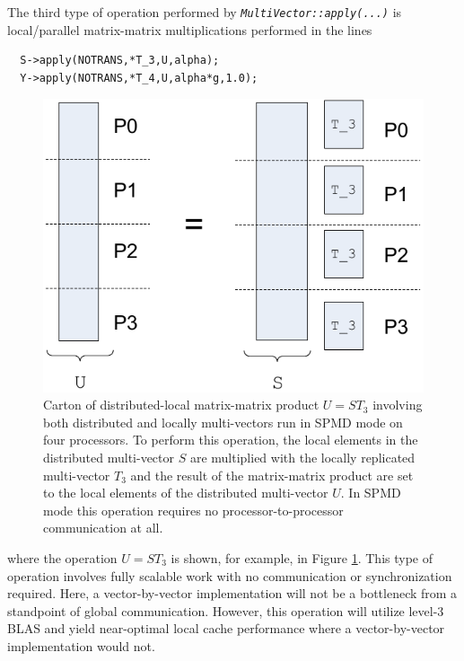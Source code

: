 \documentclass[pdf,ps2pdf,11pt]{SANDreport}
\begin{document}
The third type of operation performed by
{}\texttt{\textit{Multi\-Vector\-::apply(\-...)}} is local/parallel
matrix-matrix multiplications performed in the lines

{\scriptsize\begin{verbatim}
  S->apply(NOTRANS,*T_3,U,alpha);
  Y->apply(NOTRANS,*T_4,U,alpha*g,1.0);
\end{verbatim}}

{\bsinglespace
\begin{figure}
\begin{center}
\includegraphics*[angle=0,scale=0.60]{figures/SPMD_Dist_Local_Matrix_Matrix_Prod_P4}
\end{center}
\caption{
\label{tsfcore:fig:SPMD_Dist_Local_Matrix_Matrix_Prod_P4}
Carton of distributed-local matrix-matrix product $U = S T_3$
involving both distributed and locally multi-vectors run in SPMD mode
on four processors.  To perform this operation, the local elements in
the distributed multi-vector $S$ are multiplied with the locally
replicated multi-vector $T_3$ and the result of the matrix-matrix
product are set to the local elements of the distributed multi-vector
$U$.  In SPMD mode this operation requires no processor-to-processor
communication at all.}
\end{figure}
\esinglespace}

{}\noindent{}where the operation $U = S T_3$ is shown, for
example, in Figure
{}\ref{tsfcore:fig:SPMD_Dist_Local_Matrix_Matrix_Prod_P4}.  This type of
operation involves fully scalable work with no communication or
synchronization required.  Here, a vector-by-vector implementation
will not be a bottleneck from a standpoint of global communication.
However, this operation will utilize level-3 BLAS and yield
near-optimal local cache performance where a vector-by-vector
implementation would not.
\end{document}
